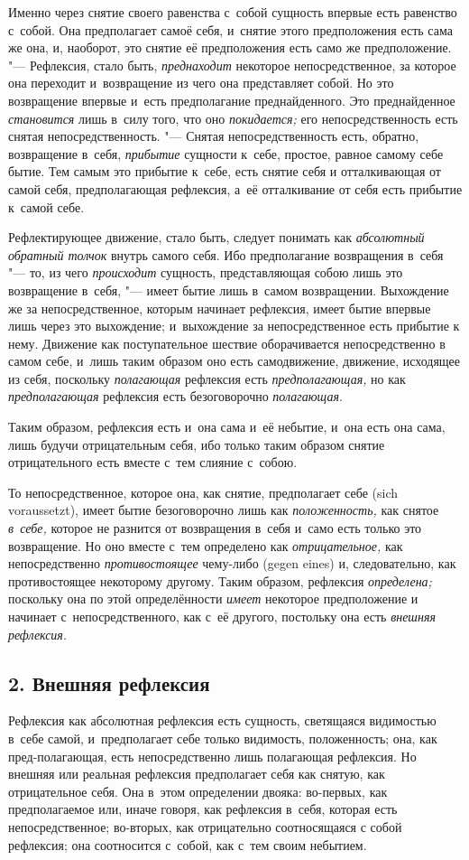 Именно через снятие своего равенства с~собой сущность впервые есть равенство
с~собой. Она предполагает самоё себя, и~снятие этого предположения есть
сама же она, и, наоборот, это снятие её предположения есть само же
предположение. "--- Рефлексия, стало быть,
{\em преднаходит} некоторое непосредственное, за
которое она переходит и~возвращение из чего она представляет собой. Но это
возвращение впервые и~есть предполагание преднайденного. Это преднайденное
{\em становится} лишь в~силу того, что оно
{\em покидается;} его непосредственность есть снятая
непосредственность. "--- Снятая непосредственность есть, обратно, возвращение
в~себя, {\em прибытие} сущности к~себе, простое, равное
самому себе бытие. Тем самым это прибытие к~себе, есть снятие себя и
отталкивающая от самой себя, предполагающая рефлексия, а~её отталкивание от
себя есть прибытие к~самой себе.

Рефлектирующее движение, стало быть, следует понимать как
{\em абсолютный обратный толчок} внутрь самого себя.
Ибо предполагание возвращения в~себя "--- то, из чего
{\em происходит} сущность, представляющая собою лишь
это возвращение в~себя, "--- имеет бытие лишь в~самом возвращении. Выхождение
же за непосредственное, которым начинает рефлексия, имеет бытие впервые
лишь через это выхождение; и~выхождение за непосредственное есть прибытие к
нему. Движение как поступательное шествие оборачивается непосредственно в
самом себе, и~лишь таким образом оно есть самодвижение, движение, исходящее
из себя, поскольку {\em полагающая} рефлексия есть
{\em предполагающая,} но как
{\em предполагающая} рефлексия есть безоговорочно
{\em полагающая}.

Таким образом, рефлексия есть и~она сама и~её небытие, и~она есть она сама,
лишь будучи отрицательным себя, ибо только таким образом снятие
отрицательного есть вместе с~тем слияние с~собою.

То непосредственное, которое она, как снятие, предполагает себе (sich
voraussetzt), имеет бытие безоговорочно лишь как
{\em положенность,} как снятое
{\em в~себе,} которое не разнится от возвращения в~себя
и~само есть только это возвращение. Но оно вместе с~тем определено как
{\em отрицательное,} как непосредственно
{\em противостоящее} чему-либо (gegen eines) и,
следовательно, как противостоящее некоторому другому. Таким образом,
рефлексия {\em определена;} поскольку она по этой
определённости {\em имеет} некоторое предположение и
начинает с~непосредственного, как с~её другого, постольку она есть
{\em внешняя рефлексия}.

\subsection[2. Внешняя рефлексия]{2. Внешняя рефлексия}
Рефлексия как абсолютная рефлексия есть
сущность, светящаяся видимостью в~себе самой, и~предполагает себе только
видимость, положенность; она, как пред-полагающая, есть непосредственно
лишь полагающая рефлексия. Но внешняя или реальная рефлексия предполагает
себя как снятую, как отрицательное себя. Она в~этом определении двояка:
во-первых, как предполагаемое или, иначе говоря, как рефлексия в~себя,
которая есть непосредственное; во-вторых, как отрицательно соотносящаяся с
собой рефлексия; она соотносится с~собой, как с~тем своим небытием.

